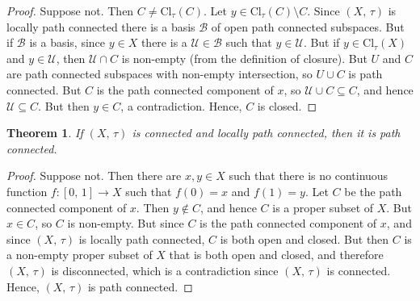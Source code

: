 \documentclass{article}
\theoremstyle{plain}
\newtheorem{theorem}{Theorem}[section]
\theoremstyle{normal}
\begin{document}
        \begin{proof}
            Suppose not. Then $C\ne\textrm{Cl}_{\tau}(C)$. Let
            $y\in\textrm{Cl}_{\tau}(C)\setminus{C}$. Since $(X,\,\tau)$ is
            locally path connected there is a basis $\mathcal{B}$ of open path
            connected subspaces. But if $\mathcal{B}$ is a basis, since
            $y\in{X}$ there is a $\mathcal{U}\in\mathcal{B}$ such that
            $y\in\mathcal{U}$. But if $y\in\textrm{Cl}_{\tau}(X)$ and
            $y\in\mathcal{U}$, then $\mathcal{U}\cap{C}$ is non-empty
            (from the definition of closure). But $U$ and $C$ are path
            connected subspaces with non-empty intersection, so
            $U\cup{C}$ is path connected. But $C$ is the path connected
            component of $x$, so $\mathcal{U}\cup{C}\subseteq{C}$, and hence
            $\mathcal{U}\subseteq{C}$. But then $y\in{C}$, a contradiction.
            Hence, $C$ is closed.
        \end{proof}
        \begin{theorem}
            If $(X,\,\tau)$ is connected and locally path connected, then it is
            path connected.
        \end{theorem}
        \begin{proof}
            Suppose not. Then there are $x,y\in{X}$ such that there is no
            continuous function $f:[0,\,1]\rightarrow{X}$ such that
            $f(0)=x$ and $f(1)=y$. Let $C$ be the path connected component of
            $x$. Then $y\notin{C}$, and hence $C$ is a proper subset of $X$.
            But $x\in{C}$, so $C$ is non-empty. But since $C$ is the path
            connected component of $x$, and since $(X,\,\tau)$ is locally path
            connected, $C$ is both open and closed. But then $C$ is a non-empty
            proper subset of $X$ that is both open and closed, and therefore
            $(X,\,\tau)$ is disconnected, which is a contradiction since
            $(X,\,\tau)$ is connected. Hence, $(X,\,\tau)$ is path connected.
        \end{proof}
\end{document}

